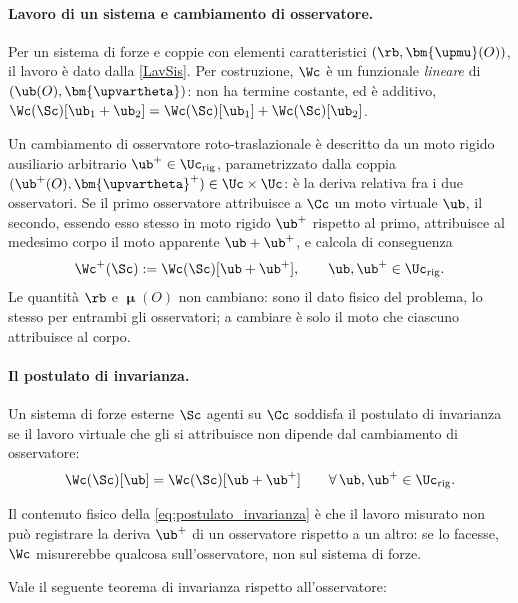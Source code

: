 \paragraph{Lavoro di un sistema e cambiamento di osservatore.}

Per un sistema di forze e coppie con elementi caratteristici
$(\rb,\bm{\upmu}(O))$, il lavoro è dato dalla \eqref{LavSis}. 
Per costruzione, $\Wc$ è un funzionale \textit{lineare} di
$(\ub(O), \bm{\upvartheta})$: non ha termine
costante, ed è additivo, $\Wc(\Sc)[\ub_1+\ub_2]=\Wc(\Sc)[\ub_1]+\Wc(\Sc)[\ub_2]$.

Un cambiamento di osservatore roto-traslazionale è descritto da un moto
rigido ausiliario arbitrario $\ub^+\in\Uc_{\rm rig}$, parametrizzato dalla coppia $(\ub^+(O),\bm{\upvartheta}^+)\in\Uc\times\Uc$: è la deriva relativa fra i due osservatori. Se il primo
osservatore attribuisce a $\Cc$ un moto virtuale $\ub$, il secondo,
essendo esso stesso in moto rigido $\ub^+$ rispetto al primo,
attribuisce al medesimo corpo il moto apparente $\ub+\ub^+$, e
calcola di conseguenza
\begin{equation}\label{eq:lavoro_osservatore_cambiato}
	\Wc^+(\Sc) := \Wc(\Sc)[\ub+\ub^+], \qquad \ub, \ub^+\in\Uc_{\rm rig}.
\end{equation}
Le quantità $\rb$ e $\bm{\upmu}(O)$ non cambiano: sono il dato fisico del
problema, lo stesso per entrambi gli osservatori; a cambiare è solo il
moto che ciascuno attribuisce al corpo.

\paragraph{Il postulato di invarianza.}

Un sistema di forze esterne $\Sc$ agenti su $\Cc$ soddisfa il postulato di
	invarianza se il lavoro virtuale che gli si attribuisce non dipende dal
	cambiamento di osservatore:
	\begin{equation}\label{eq:postulato_invarianza}
		\Wc(\Sc)[\ub] = \Wc(\Sc)[\ub+\ub^+]
		\qquad \forall\,\ub,\ub^+\in\Uc_{\rm rig}.
	\end{equation}


Il contenuto fisico della \eqref{eq:postulato_invarianza} è che il lavoro
misurato non può registrare la deriva $\ub^+$ di un osservatore
rispetto a un altro: se lo facesse, $\Wc$ misurerebbe qualcosa
sull'osservatore, non sul sistema di forze.

Vale  il seguente teorema di invarianza rispetto all'osservatore:

